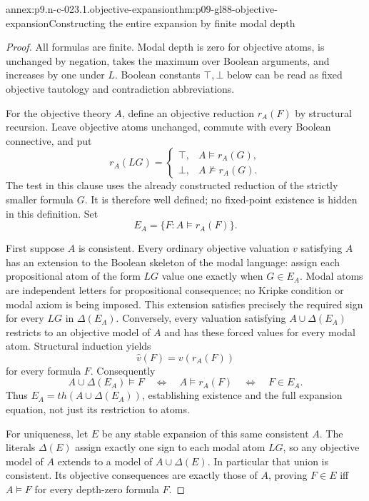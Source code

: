 \begin{annexitem}{annex:p9.n-c-023.1.objective-expansion}{thm:p09-gl88-objective-expansion}{Constructing the entire expansion by finite modal depth}
\begin{proof}
All formulas are finite.  Modal depth is zero for objective atoms, is
unchanged by negation, takes the maximum over Boolean arguments, and
increases by one under \(L\).  Boolean constants \(\top,\bot\) below
can be read as fixed objective tautology and contradiction abbreviations.

For the objective theory \(A\), define an objective reduction \(r_A(F)\)
by structural recursion.  Leave objective atoms unchanged, commute with
every Boolean connective, and put
\[
 r_A(LG)=
 \begin{cases}
 \top,&A\models r_A(G),\\
 \bot,&A\not\models r_A(G).
 \end{cases}
\]
The test in this clause uses the already constructed reduction of the
strictly smaller formula \(G\).  It is therefore well defined; no
fixed-point existence is hidden in this definition.  Set
\[
 E_A=\{F:A\models r_A(F)\}.
\]

First suppose \(A\) is consistent.  Every ordinary objective valuation
\(v\) satisfying \(A\) has an extension to the Boolean skeleton of the
modal language: assign each propositional atom of the form \(LG\) value
one exactly when \(G\in E_A\).  Modal atoms are independent letters for
propositional consequence; no Kripke condition or modal axiom is being
imposed.  This extension satisfies precisely the required sign for every
\(LG\) in \(\Delta(E_A)\).  Conversely, every valuation satisfying
\(A\cup\Delta(E_A)\) restricts to an objective model of \(A\) and has
these forced values for every modal atom.  Structural induction yields
\[
 \widehat v(F)=v(r_A(F))
\]
for every formula \(F\).  Consequently
\[
 A\cup\Delta(E_A)\models F
 \quad\Longleftrightarrow\quad A\models r_A(F)
 \quad\Longleftrightarrow\quad F\in E_A.
\]
Thus \(E_A=th(A\cup\Delta(E_A))\), establishing existence and the full
expansion equation, not just its restriction to atoms.

For uniqueness, let \(E\) be any stable expansion of this same consistent
\(A\).  The literals \(\Delta(E)\) assign exactly one sign to each
modal atom \(LG\), so any objective model of \(A\) extends to a model
of \(A\cup\Delta(E)\).  In particular that union is consistent.  Its
objective consequences are exactly those of \(A\), proving
\(F\in E\) iff \(A\models F\) for every depth-zero formula \(F\).


\end{proof}
\end{annexitem}
